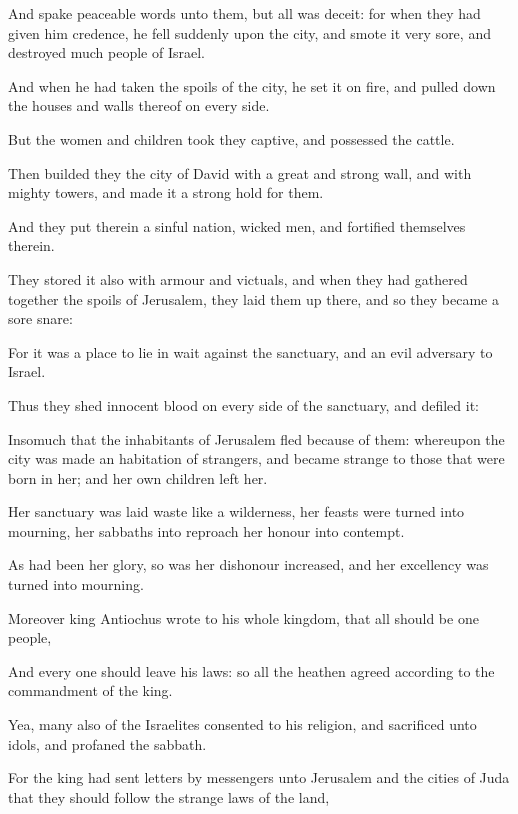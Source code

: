 {\par }{\PP {}And spake peaceable words unto them, but all was deceit: for when they had given him credence, he fell suddenly upon the city, and smote it very sore, and destroyed much people of Israel.
\par }{\PP {}And when he had taken the spoils of the city, he set it on fire, and pulled down the houses and walls thereof on every side.
\par }{\PP {}But the women and children took they captive, and possessed the cattle.
\par }{\PP {}Then builded they the city of David with a great and strong wall, and with mighty towers, and made it a strong hold for them.
\par }{\PP {}And they put therein a sinful nation, wicked men, and fortified themselves therein.
\par }{\PP {}They stored it also with armour and victuals, and when they had gathered together the spoils of Jerusalem, they laid them up there, and so they became a sore snare:
\par }{\PP {}For it was a place to lie in wait against the sanctuary, and an evil adversary to Israel.
\par }{\PP {}Thus they shed innocent blood on every side of the sanctuary, and defiled it:
\par }{\PP {}Insomuch that the inhabitants of Jerusalem fled because of them: whereupon the city was made an habitation of strangers, and became strange to those that were born in her; and her own children left her.
\par }{\PP {}Her sanctuary was laid waste like a wilderness, her feasts were turned into mourning, her sabbaths into reproach her honour into contempt.
\par }{\PP {}As had been her glory, so was her dishonour increased, and her excellency was turned into mourning.
\par }{\PP {}Moreover king Antiochus wrote to his whole kingdom, that all should be one people,
\par }{\PP {}And every one should leave his laws: so all the heathen agreed according to the commandment of the king.
\par }{\PP {}Yea, many also of the Israelites consented to his religion, and sacrificed unto idols, and profaned the sabbath.
\par }{\PP {}For the king had sent letters by messengers unto Jerusalem and the cities of Juda that they should follow the strange laws of the land,
}
